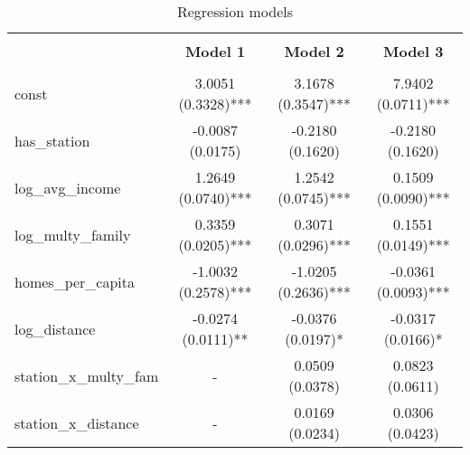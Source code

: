 
    \begin{table}
        \centering
        \caption{Regression models}
        \vspace{10pt}
        \label{tab:regression_models}
        \begin{tabular}{lccc}
        \hline
        \hline \\[-1.8ex]
     & \textbf{Model 1} & \textbf{Model 2} & \textbf{Model 3} \\
\hline \\[-1.8ex] 
const & 3.0051 (0.3328)*** & 3.1678 (0.3547)*** & 7.9402 (0.0711)*** \\
has\_station & -0.0087 (0.0175) & -0.2180 (0.1620) & -0.2180 (0.1620) \\
log\_avg\_income & 1.2649 (0.0740)*** & 1.2542 (0.0745)*** & 0.1509 (0.0090)*** \\
log\_multy\_family & 0.3359 (0.0205)*** & 0.3071 (0.0296)*** & 0.1551 (0.0149)*** \\
homes\_per\_capita & -1.0032 (0.2578)*** & -1.0205 (0.2636)*** & -0.0361 (0.0093)*** \\
log\_distance & -0.0274 (0.0111)** & -0.0376 (0.0197)* & -0.0317 (0.0166)* \\
station\_x\_multy\_fam & - & 0.0509 (0.0378) & 0.0823 (0.0611) \\
station\_x\_distance & - & 0.0169 (0.0234) & 0.0306 (0.0423) \\

        \hline
        \hline
        \end{tabular}
    \end{table}
    